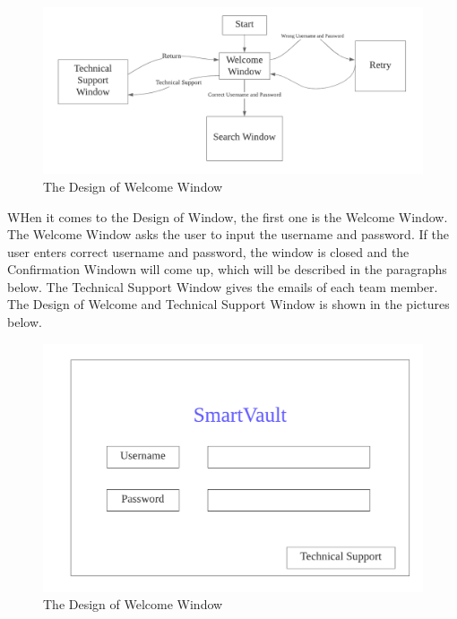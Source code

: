 \documentclass[12pt, titlepage]{article}
\begin{document}
\begin{figure}[H]
    \centering
    \includegraphics[scale=0.8]{FSM1.png}
    \caption{The Design of Welcome Window}
\end{figure}

WHen it comes to the Design of Window, the first one is the Welcome Window. The Welcome Window asks the user to input the username and password. If the user enters correct username and password, the window is closed and the Confirmation Windown will come up, which will be described in the paragraphs below. The Technical Support Window gives the emails of each team member. The Design of Welcome and Technical Support Window is shown in the pictures below. 

\begin{figure}[H]
    \centering
    \includegraphics[scale=0.8]{Welcome.png}
    \caption{The Design of Welcome Window}
\end{figure}
\end{document}

